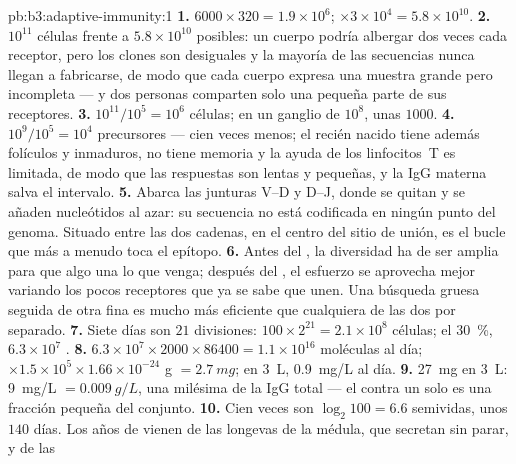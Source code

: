 \begin{solution}{pb:b3:adaptive-immunity:1}
\textbf{1.} $6000\times 320 = 1.9\times 10^{6}$; $\times 3\times 10^{4}
= 5.8\times 10^{10}$.
\textbf{2.} $10^{11}$ células frente a $5.8\times 10^{10}$ posibles: un
cuerpo podría albergar dos veces cada receptor, pero los clones son
desiguales y la mayoría de las secuencias nunca llegan a fabricarse, de
modo que cada cuerpo expresa una muestra grande pero incompleta --- y dos
personas comparten solo una pequeña parte de sus receptores.
\textbf{3.} $10^{11}/10^{5} = 10^{6}$ células; en un ganglio de $10^{8}$,
unas $1000$.
\textbf{4.} $10^{9}/10^{5} = 10^{4}$ precursores --- cien veces menos; el
recién nacido tiene además folículos y  inmaduros, no
tiene memoria y la ayuda de los linfocitos~T es limitada, de modo que las
respuestas son lentas y pequeñas, y la IgG materna salva el intervalo.
\textbf{5.} Abarca las junturas V--D y D--J, donde se quitan y se añaden
nucleótidos al azar: su secuencia no está codificada en ningún punto del
genoma. Situado entre las dos cadenas, en el centro del sitio de unión,
es el bucle que más a menudo toca el epítopo.
\textbf{6.} Antes del , la diversidad ha de ser amplia para que
algo una lo que venga; después del , el esfuerzo se aprovecha
mejor variando los pocos receptores que ya se sabe que unen. Una búsqueda
gruesa seguida de otra fina es mucho más eficiente que cualquiera de las
dos por separado.
\textbf{7.} Siete días son $21$ divisiones: $100\times 2^{21} = 2.1\times
10^{8}$ células; el \qty{30}{\%}, $6.3\times 10^{7}$ .
\textbf{8.} $6.3\times 10^{7}\times 2000\times \num{86400} = 1.1\times
10^{16}$ moléculas al día; $\times 1.5\times 10^{5}\times 1.66\times
10^{-24}$ g $= \qty{2.7}{mg}$; en \qty{3}{L}, \qty{0.9}{mg/L} al día.
\textbf{9.} \qty{27}{mg} en \qty{3}{L}: \qty{9}{mg/L} $= \qty{0.009}{g/L}$,
una milésima de la IgG total --- el  contra un solo  es
una fracción pequeña del conjunto.
\textbf{10.} Cien veces son $\log_{2}100 = 6.6$ semividas, unos $140$
días. Los años de  vienen de las  longevas
de la médula, que secretan sin parar, y de las 

\end{solution}
